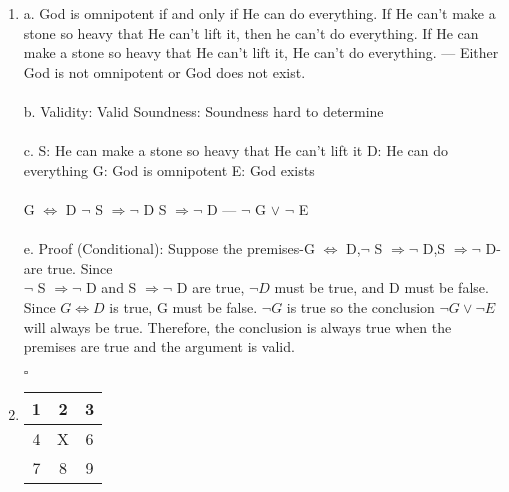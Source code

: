 \documentclass[]{article}
\begin{document}
\begin{enumerate}
    \item a.
    \newline
    God is omnipotent if and only if He can do everything.
    \newline
    If He can't make a stone so heavy that He can't lift it, then he can't do everything.    
    \newline
    If He can make a stone so heavy that He can't lift it, He can't do everything.
    \newline
    ---
    \newline
    Either God is not omnipotent or God does not exist.
    \\\\b.
    Validity: Valid
    \newline
    Soundness: Soundness hard to determine
    \\\\c.
    \newline S: He can make a stone so heavy that He can't lift it
    \newline D: He can do everything
    \newline G: God is omnipotent
    \newline E: God exists
    \\\\ G $\iff$ D
    \newline $\neg$ S $\Rightarrow \neg$ D
    \newline S $\Rightarrow \neg$ D
    \newline ---
    \newline $\neg$ G $\lor$ $\neg$ E
    \\\\e.
    \newline Proof (Conditional):
    \newline Suppose the premises-G $\iff$ D,$\neg$ S $\Rightarrow \neg$ D,S $\Rightarrow \neg$ D-are true. Since \\ $\neg$ S $\Rightarrow \neg$ D and S $\Rightarrow \neg$ D are true, $\neg D$ must be true, and D must be false. Since $G \iff D$ is true, G must be false. $\neg G$ is true so the conclusion $\neg G \lor \neg E$ will always be true. Therefore, the conclusion is always true when the premises are true and the argument is valid.
    \begin{flushright}
    $\square$
    \end{flushright}
    
    \item 
        \begin{tabular}{ c| c |c }
            1 & 2 & 3 \\
            \hline
            4 & X & 6 \\
            \hline
            7 & 8 & 9
        \end{tabular}
        

\end{enumerate}
\end{document}
